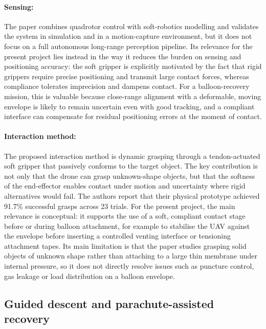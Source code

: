 \paragraph{Sensing:} The paper combines quadrotor control with soft-robotics modelling and validates the system in simulation and in a motion-capture environment, but it does not focus on a full autonomous long-range perception pipeline. Its relevance for the present project lies instead in the way it reduces the burden on sensing and positioning accuracy: the soft gripper is explicitly motivated by the fact that rigid grippers require precise positioning and transmit large contact forces, whereas compliance tolerates imprecision and dampens contact. For a balloon-recovery mission, this is valuable because close-range alignment with a deformable, moving envelope is likely to remain uncertain even with good tracking, and a compliant interface can compensate for residual positioning errors at the moment of contact. \cite{Fishman2021DynamicPractice}

\paragraph{Interaction method:} The proposed interaction method is dynamic grasping through a tendon-actuated soft gripper that passively conforms to the target object. The key contribution is not only that the drone can grasp unknown-shape objects, but that the softness of the end-effector enables contact under motion and uncertainty where rigid alternatives would fail. The authors report that their physical prototype achieved 91.7\% successful grasps across 23 trials. For the present project, the main relevance is conceptual: it supports the use of a soft, compliant contact stage before or during balloon attachment, for example to stabilise the UAV against the envelope before inserting a controlled venting interface or tensioning attachment tapes. Its main limitation is that the paper studies grasping solid objects of unknown shape rather than attaching to a large thin membrane under internal pressure, so it does not directly resolve issues such as puncture control, gas leakage or load distribution on a balloon envelope. \cite{Fishman2021DynamicPractice}





\subsection{ Guided descent and parachute-assisted recovery}



